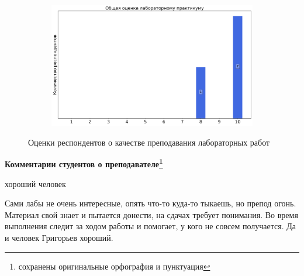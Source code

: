 \begin{figure}[H]
\begin{subfigure}[b]{0.45\textwidth}
			\end{subfigure}
			\begin{subfigure}[b]{0.45\textwidth}
				\centering
				\includegraphics[width=\textwidth]{images/3 course/Аналоговая электроника/labniks-marks-Григорьев И.А.-3.png}
			\end{subfigure}	
			\caption{Оценки респондентов о качестве преподавания лабораторных работ}
		\end{figure}

		\textbf{Комментарии студентов о преподавателе\protect\footnote{сохранены оригинальные орфография и пунктуация}}
            \begin{commentbox} 
                хороший человек 
            \end{commentbox} 
        
            \begin{commentbox} 
                Сами лабы не очень интересные, опять что-то куда-то тыкаешь, но препод огонь. Материал свой знает и пытается донести, на сдачах требует понимания. Во время выполнения следит за ходом работы и помогает, у кого не совсем получается. Да и человек Григорьев хороший. 
            \end{commentbox}



